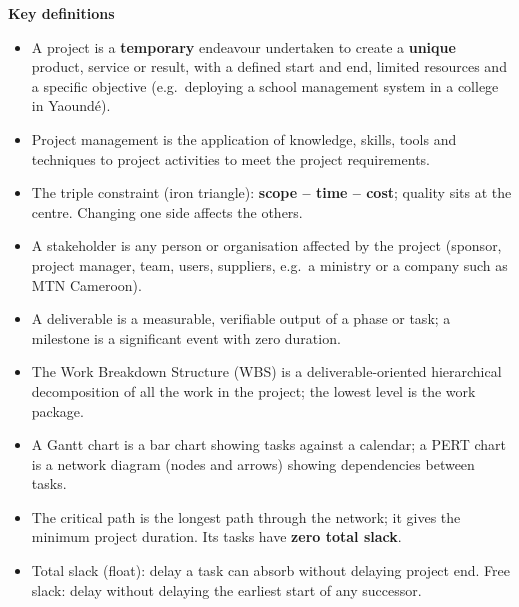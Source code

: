 \documentclass[11pt]{article}
\newcommand{\cle}[1]{{\popxbold\color{popdark}#1}}
\begin{document}
\begin{bilan}
\textbf{Key definitions}
\begin{itemize}
\item A \cle{project} is a \textbf{temporary} endeavour undertaken to create a \textbf{unique} product, service or result, with a defined start and end, limited resources and a specific objective (e.g.\ deploying a school management system in a college in Yaound\'e).
\item \cle{Project management} is the application of knowledge, skills, tools and techniques to project activities to meet the project requirements.
\item The \cle{triple constraint} (iron triangle): \textbf{scope -- time -- cost}; quality sits at the centre. Changing one side affects the others.
\item A \cle{stakeholder} is any person or organisation affected by the project (sponsor, project manager, team, users, suppliers, e.g.\ a ministry or a company such as MTN Cameroon).
\item A \cle{deliverable} is a measurable, verifiable output of a phase or task; a \cle{milestone} is a significant event with zero duration.
\item The \cle{Work Breakdown Structure} (WBS) is a deliverable-oriented hierarchical decomposition of all the work in the project; the lowest level is the \cle{work package}.
\item A \cle{Gantt chart} is a bar chart showing tasks against a calendar; a \cle{PERT chart} is a network diagram (nodes and arrows) showing dependencies between tasks.
\item The \cle{critical path} is the longest path through the network; it gives the minimum project duration. Its tasks have \textbf{zero total slack}.
\item \cle{Total slack} (float): delay a task can absorb without delaying project end. \cle{Free slack}: delay without delaying the earliest start of any successor.
\end{itemize}


\end{bilan}
\end{document}

